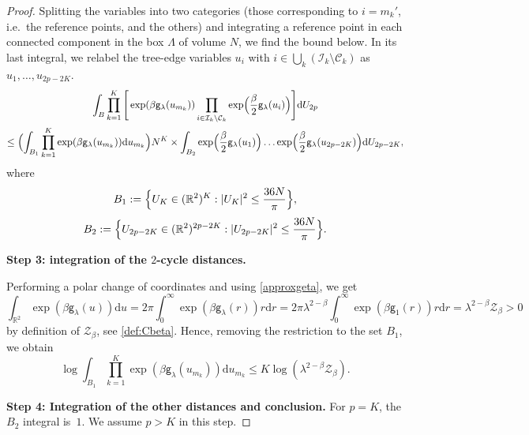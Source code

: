 \documentclass[a4paper,10pt,leqno]{amsart}
\numberwithin{equation}{section}
\newcommand{\R}{\mathbb{R}}
\newcommand{\dd}{\mathrm{d}}
\def\mc{\mathcal}
\def\g{\mathsf{g}}
\begin{document}
\begin{proof}
  Splitting the variables into two categories (those corresponding to $i =m_k'$, i.e.~the reference points, and the others) and integrating a reference point in each connected component in the box $\Lambda$ of volume $N$, we find the bound below. In its last integral, we relabel the tree-edge variables $u_i$ with $i\in\bigcup_k(\mathcal I_k\setminus\mathcal C_k)$ as $u_1,\ldots,u_{2p-2K}$.
  \begin{multline}\label{eq:cutt}
    \int_{B}\prod_{k=1}^K \Bigg[\exp(\beta\g_\lambda(u_{m_k}))\prod_{i\in \mathcal{I}_k \backslash \mathcal C_k } \exp\Bigl(\frac{\beta}{2}\g_\lambda(u_i) \Bigr)\Bigg]\dd U_{2p}\\ \leq \Bigl(\int_{B_1}
    \prod_{k=1}^K \exp(\beta \g_\lambda(u_{m_k}))
    \dd u_{m_k}\Bigr) N^K
    \times\int_{B_2}\exp\Bigl(\frac{\beta}{2}\g_\lambda(u_1)\Bigr)\ldots \exp\Bigl(\frac{\beta}{2}\g_\lambda(u_{2p-2K})\Bigr)\dd U_{2p-2K},
  \end{multline}
  where
  \begin{equation*}
    B_1:=\Bigl\{U_{K}\in (\R^2)^K:|U_{K}|^2\leq \frac{36N}{\pi}\Bigr\},
  \end{equation*}
  \begin{equation*}
    B_2:=\Bigl\{U_{2p-2K}\in (\R^2)^{2p-2K}:|U_{2p-2K}|^2\leq \frac{ 36 N}{\pi}\Bigr\}.
  \end{equation*}

  \noindent
  \textbf{Step 3: integration of the $2$-cycle distances.}

  Performing a polar change of coordinates and using \eqref{approxgeta}, we get
  \begin{equation}\label{3.20b}
    \int_{\R^2}\exp(\beta \g_\lambda(u))\dd u=2\pi\int_0^{\infty}\exp(\beta \g_\lambda(r))r\dd r=2\pi\lambda^{2-\beta}\int_0^{\infty}\exp(\beta \g_1(r))r\dd r=\lambda^{2-\beta}\mathcal Z_{\beta}>0
  \end{equation}
  by definition of $\mc{Z}_\beta$, see \eqref{def:Cbeta}. Hence, removing the restriction to the set $B_1$, we obtain
  \begin{equation*}
    \log\int_{B_1} \prod_{k=1}^K \exp(\beta \g_\lambda(u_{m_k}))\dd u_{m_k}\leq K\log (\lambda^{2-\beta}\mc{Z}_\beta).
  \end{equation*}

  \noindent
  \textbf{Step 4: Integration of the other distances and conclusion.}
  For $p=K$, the $B_2$ integral is~$1$. We assume $p>K$ in this step.


\end{proof}
\end{document}
